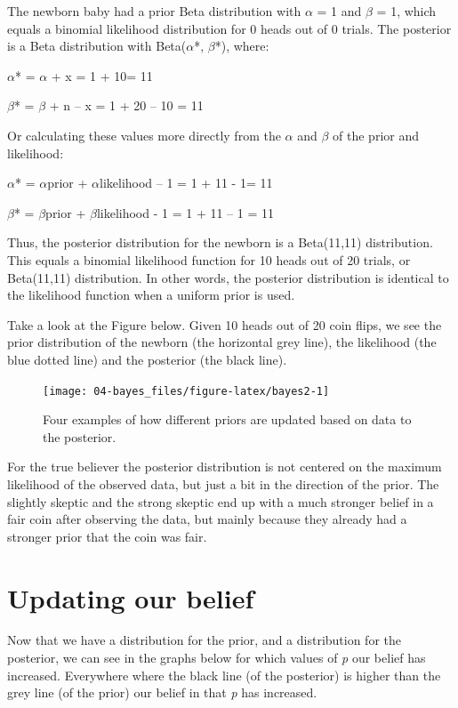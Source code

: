 \documentclass[
]{krantz}
\begin{document}
The newborn baby had a prior Beta distribution with \(\alpha\) = 1 and \(\beta\) = 1, which equals a binomial likelihood distribution for 0 heads out of 0 trials. The posterior is a Beta distribution with Beta(\(\alpha\)*, \(\beta\)*), where:

\(\alpha\)* = \(\alpha\) + x = 1 + 10= 11

\(\beta\)* = \(\beta\) + n -- x = 1 + 20 -- 10 = 11

Or calculating these values more directly from the \(\alpha\) and \(\beta\) of the prior and
likelihood:

\(\alpha\)* = \(\alpha\)prior + \(\alpha\)likelihood -- 1 = 1 + 11 - 1= 11

\(\beta\)* = \(\beta\)prior + \(\beta\)likelihood - 1 = 1 + 11 -- 1 = 11

Thus, the posterior distribution for the newborn is a Beta(11,11) distribution. This equals a binomial likelihood function for 10 heads out of 20 trials, or Beta(11,11) distribution. In other words, the posterior distribution is identical to the likelihood function when a uniform prior is used.

Take a look at the Figure below. Given 10 heads out of 20 coin flips, we see the prior distribution of the newborn (the horizontal grey line), the likelihood (the blue dotted line) and the posterior (the black line).

\begin{figure}

{\centering \texttt{[image: 04-bayes\_files/figure-latex/bayes2-1]} 

}

\caption{Four examples of how different priors are updated based on data to the posterior.}\label{fig:bayes2}
\end{figure}

For the true believer the posterior distribution is not centered on the maximum likelihood of the observed data, but just a bit in the direction of the prior. The slightly skeptic and the strong skeptic end up with a much stronger belief in a fair coin after observing the data, but mainly because they already had a stronger prior that the coin was fair.

\hypertarget{updating-our-belief}{%
\section{Updating our belief}\label{updating-our-belief}}

Now that we have a distribution for the prior, and a distribution for the posterior, we can see in the graphs below for which values of \emph{p} our belief has increased. Everywhere where the black line (of the posterior) is higher than the grey line (of the prior) our belief in that \emph{p} has increased.
\end{document}

